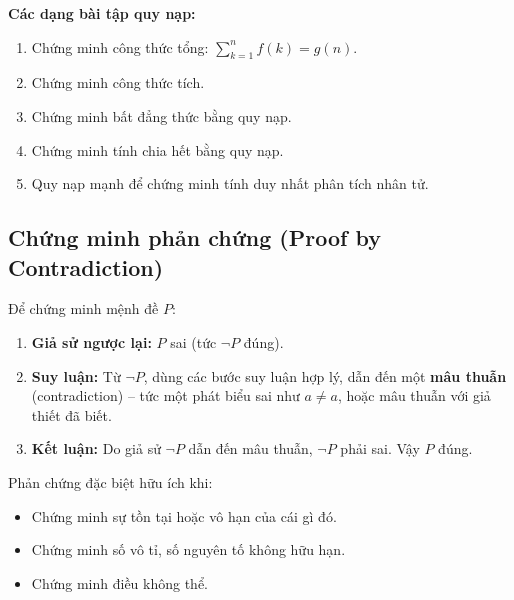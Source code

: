 \documentclass[12pt,a4paper]{article}
\begin{document}
\medskip\noindent\textbf{Các dạng bài tập quy nạp:}
\begin{enumerate}[label=\textbf{Dạng \arabic*:}, leftmargin=*, align=left]
  \item Chứng minh công thức tổng: $\displaystyle\sum_{k=1}^n f(k) = g(n)$.
  \item Chứng minh công thức tích.
  \item Chứng minh bất đẳng thức bằng quy nạp.
  \item Chứng minh tính chia hết bằng quy nạp.
  \item Quy nạp mạnh để chứng minh tính duy nhất phân tích nhân tử.
\end{enumerate}

\subsection{Chứng minh phản chứng (Proof by Contradiction)}

\begin{phuongphap}[title={Phương pháp phản chứng (Reductio ad Absurdum)}]
  Để chứng minh mệnh đề $P$:
  \begin{enumerate}
    \item \textbf{Giả sử ngược lại:} $P$ sai (tức $\neg P$ đúng).
    \item \textbf{Suy luận:} Từ $\neg P$, dùng các bước suy luận hợp lý, dẫn đến một \textbf{mâu thuẫn} (contradiction) -- tức một phát biểu sai như $a \ne a$, hoặc mâu thuẫn với giả thiết đã biết.
    \item \textbf{Kết luận:} Do giả sử $\neg P$ dẫn đến mâu thuẫn, $\neg P$ phải sai. Vậy $P$ đúng.
  \end{enumerate}
\end{phuongphap}

\begin{luuy}
  Phản chứng đặc biệt hữu ích khi:
  \begin{itemize}
    \item Chứng minh sự tồn tại hoặc vô hạn của cái gì đó.
    \item Chứng minh số vô tỉ, số nguyên tố không hữu hạn.
    \item Chứng minh điều không thể.
  \end{itemize}
\end{luuy}
\end{document}
